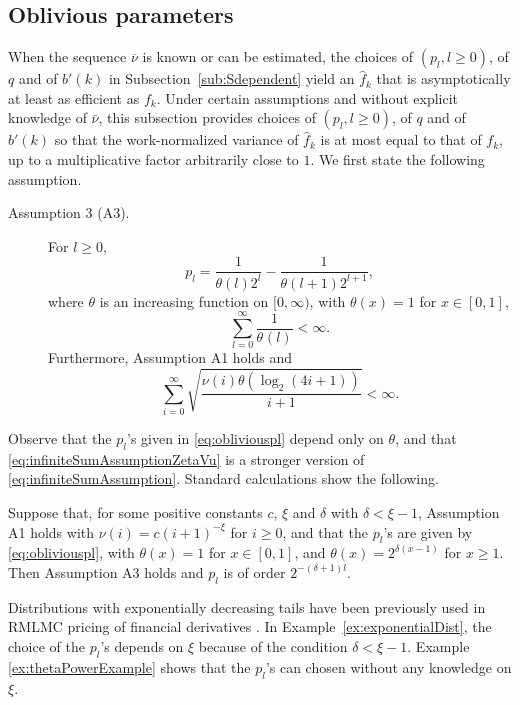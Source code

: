 \documentclass[a4paper,11pt]{article}
\begin{document}
\subsection{Oblivious parameters}\label{sub:Oblivious}
When the sequence \(\overline\nu\) is known or can be estimated, the choices of    \((p_{l},l\geq0)\),  of \(q\) and of \(b'(k)\) in Subsection~\ref{sub:Sdependent} yield an  \(\hat f_{k}\) that is asymptotically at least as efficient as  \(f_{k}\). Under certain assumptions and without  explicit knowledge of \(\bar\nu\),   this subsection provides choices of    \((p_{l},l\geq0)\),  of \(q\) and of \(b'(k)\)   so that the work-normalized variance of    \(\hat f_{k}\) is at most equal to that of   \(f_{k}\), up to a multiplicative factor arbitrarily close to \(1\).    We first state the following assumption.  \begin{description}
\item[Assumption 3 (A3).] For  \(l\geq0\),  \begin{equation}\label{eq:obliviouspl}
p_{l}=\frac{1}{\theta(l)2^{l}}-\frac{1}{\theta(l+1)2^{l+1}},
\end{equation} where \(\theta\) is an increasing function on \([0,\infty)\), with 
 \(\theta(x)=1\) for \(x\in[0,1]\),  
\begin{equation}\label{eq:infiniteSumAssumptionZeta}
\sum^{\infty}_{l=0}\frac{1}{\theta^{}(l)}<\infty.
\end{equation} Furthermore, Assumption A1 holds and \begin{equation}\label{eq:infiniteSumAssumptionZetaVu}
\sum^{\infty}_{i=0}\sqrt{\frac{\nu(i)\theta(\log_{2}(4i+1))}{i+1}}<\infty.
\end{equation} \end{description}
Observe that the \(p_{l}\)'s given in \eqref{eq:obliviouspl} depend only on \(\theta\), and that  \eqref{eq:infiniteSumAssumptionZetaVu} is a stronger version of 
 \eqref{eq:infiniteSumAssumption}. Standard calculations show the following.   

\begin{example}\label{ex:exponentialDist}Suppose that, for some positive constants \(c\), \(\xi\) and \(\delta\) with \(\delta<\xi-1\), Assumption A1 holds with \(\nu(i)= c(i+1)^{-\xi}\) for \(i\geq0\),  and that the \(p_{l}\)'s are given by \eqref{eq:obliviouspl},  with  
 \(\theta(x)=1\) for \(x\in[0,1]\), and \(\theta(x)=2^{\delta(x-1)}\) for \(x\geq1\). Then Assumption A3 holds and \(p_{l}\) is of order \(2^{-(\delta+1)l}\).   \end{example}
Distributions with exponentially decreasing tails have  been previously used in  RMLMC pricing of financial derivatives \cite{GlynnRhee2015unbiased,kahale2020Asian}. In Example~\ref{ex:exponentialDist}, the choice of the \(p_{l}\)'s depends  on \(\xi\) because of the condition \(\delta<\xi-1\). Example \ref{ex:thetaPowerExample} shows that  the \(p_{l}\)'s can chosen without any knowledge on \(\xi\).       
\end{document}
